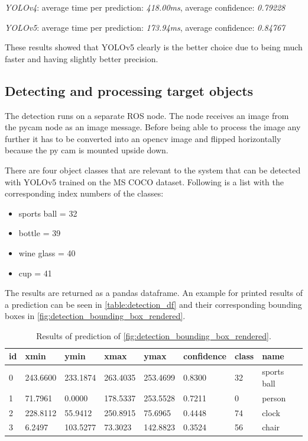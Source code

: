 \textit{YOLOv4}: average time per prediction: \textit{418.00ms}, average confidence: \textit{0.79228}

\textit{YOLOv5}: average time per prediction: \textit{173.94ms}, average confidence: \textit{0.84767}

These results showed that YOLOv5 clearly is the better choice due to being much faster and having slightly better precision.


\subsection{Detecting and processing target objects}

The detection runs on a separate \ac{ROS} node. The node receives an image from the pycam node as an image message. Before being able to process the image any further it has to be converted into an opencv image and flipped horizontally because the py cam is mounted upside down.

There are four object classes that are relevant to the system that can be detected with YOLOv5 trained on the MS COCO dataset. Following is a list with the corresponding index numbers of the classes:


\begin{itemize}
  \item sports ball = 32
  \item bottle = 39
  \item wine glass = 40
  \item cup = 41
\end{itemize}

The results are returned as a pandas dataframe. An example for printed results of a prediction can be seen in \autoref{table:detection_df} and their corresponding bounding boxes in \autoref{fig:detection_bounding_box_rendered}.

\begin{table}[h]
  \caption{Results of prediction of \autoref{fig:detection_bounding_box_rendered}.}
  \label{table:detection_df}
  \renewcommand{\arraystretch}{1.2}
  \centering
  \sffamily
  \begin{footnotesize}
    \begin{tabularx}{0.7\textwidth}{l L L L L L L L}
      \toprule
      \textbf{id} & \textbf{xmin} & \textbf{ymin} & \textbf{xmax} & \textbf{ymax} & \textbf{confidence} & \textbf{class} & \textbf{name}\\
       & 243.6600 & 233.1874 & 263.4035 & 253.4699 & 0.8300 & 32 & sports ball \\
      1 & 71.7961 & 0.0000 & 178.5337 & 253.5528 & 0.7211 & 0 & person \\
      2 & 228.8112 & 55.9412 & 250.8915 & 75.6965 & 0.4448 & 74 & clock \\
      3 & 6.2497 & 103.5277 & 73.3023 & 142.8823 & 0.3524 & 56 & chair \\
      \bottomrule
    \end{tabularx}
  \end{footnotesize}
  \rmfamily
\end{table}

